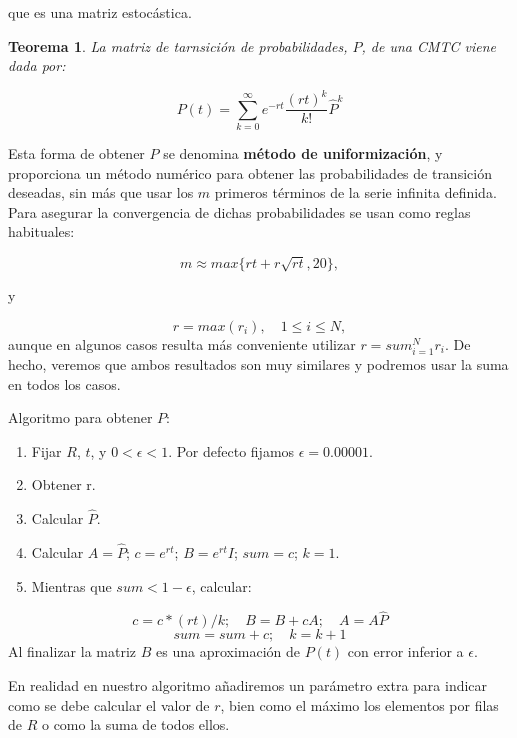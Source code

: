 \documentclass[
]{book}
\providecommand{\tightlist}{%
  \setlength{\itemsep}{0pt}\setlength{\parskip}{0pt}}
\newenvironment{silverbox}{
  \definecolor{shadecolor}{rgb}{192, 192, 192}  
  \color{black}
  \begin{shaded}}
 {\end{shaded}}
\newtheorem{theorem}{Teorema}[chapter]
\theoremstyle{definition}
\theoremstyle{definition}
\theoremstyle{definition}
\theoremstyle{definition}
\theoremstyle{remark}
\begin{document}
que es una matriz estocástica.

\begin{theorem}
La matriz de tarnsición de probabilidades, \(P\), de una CMTC viene dada por:

\[P(t) = \sum_{k=0}^{\infty} e^{-rt}\frac{(rt)^k}{k!} \hat{P}^k\]
\end{theorem}

Esta forma de obtener \(P\) se denomina \textbf{método de uniformización}, y proporciona un método numérico para obtener las probabilidades de transición deseadas, sin más que usar los \(m\) primeros términos de la serie infinita definida. Para asegurar la convergencia de dichas probabilidades se usan como reglas habituales:

\[m \approx max\{rt + r\sqrt{rt}, 20\},\]

y

\[r = max(r_i), \quad 1\leq i \leq N,\] aunque en algunos casos resulta más conveniente utilizar \(r = sum_{i=1}^N r_i\). De hecho, veremos que ambos resultados son muy similares y podremos usar la suma en todos los casos.

\begin{silverbox}
Algoritmo para obtener \(P\):

\begin{enumerate}
\def\labelenumi{\arabic{enumi}.}
\tightlist
\item
  Fijar \(R\), \(t\), y \(0 < \epsilon < 1\). Por defecto fijamos \(\epsilon = 0.00001\).
\item
  Obtener r.
\item
  Calcular \(\hat{P}\).
\item
  Calcular \(A = \hat{P}\); \(c = e^{rt}\); \(B = e^{rt}I\); \(sum = c\); \(k=1.\)
\item
  Mientras que \(sum < 1-\epsilon\), calcular:
\end{enumerate}

\[c = c*(rt)/k; \quad B = B + cA; \quad A = A \hat{P}\] \[sum = sum + c; \quad k = k + 1\] Al finalizar la matriz \(B\) es una aproximación de \(P(t)\) con error inferior a \(\epsilon\).

\end{silverbox}

En realidad en nuestro algoritmo añadiremos un parámetro extra para indicar como se debe calcular el valor de \(r\), bien como el máximo los elementos por filas de \(R\) o como la suma de todos ellos.
\end{document}
